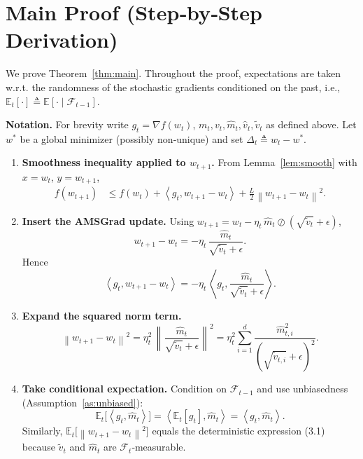 \documentclass{article}
\newcommand{\E}{\mathbb{E}}
\newcommand{\norm}[1]{\left\lVert #1 \right\rVert}
\newcommand{\inner}[2]{\left\langle #1,#2 \right\rangle}
\begin{document}
\section*{Main Proof (Step‑by‑Step Derivation)}
We prove Theorem~\ref{thm:main}. Throughout the proof, expectations are taken w.r.t. the randomness of the stochastic gradients conditioned on the past, i.e., $\E_{t}[\cdot]\triangleq \E[\cdot\mid\mathcal{F}_{t-1}]$.

\noindent\textbf{Notation.} For brevity write $g_{t}=\nabla f(w_{t})$, $m_{t},v_{t},\hat m_{t},\hat v_{t},\tilde v_{t}$ as defined above. Let $w^{*}$ be a global minimizer (possibly non‑unique) and set $\Delta_{t}\triangleq w_{t}-w^{*}$.

\begin{enumerate}
\item[Step 1.] \textbf{Smoothness inequality applied to $w_{t+1}$.}  
From Lemma~\ref{lem:smooth} with $x=w_{t}$, $y=w_{t+1}$,
\begin{align}
f(w_{t+1}) &\le f(w_{t}) + \inner{g_{t}}{w_{t+1}-w_{t}} + \frac{L}{2}\norm{w_{t+1}-w_{t}}^{2}. \label{eq:smooth}
\end{align}
\item[Step 2.] \textbf{Insert the AMSGrad update.}  
Using $w_{t+1}=w_{t}-\eta_{t}\,\hat m_{t}\oslash(\sqrt{\tilde v_{t}}+\epsilon)$,
\[
w_{t+1}-w_{t}= -\eta_{t}\,\frac{\hat m_{t}}{\sqrt{\tilde v_{t}}+\epsilon}.
\]
Hence
\[
\inner{g_{t}}{w_{t+1}-w_{t}} = -\eta_{t}\,\inner{g_{t}}{\frac{\hat m_{t}}{\sqrt{\tilde v_{t}}+\epsilon}}.
\tag{2.1}
\]
\item[Step 3.] \textbf{Expand the squared norm term.}
\[
\norm{w_{t+1}-w_{t}}^{2}= \eta_{t}^{2}\,
\norm{\frac{\hat m_{t}}{\sqrt{\tilde v_{t}}+\epsilon}}^{2}
= \eta_{t}^{2}\sum_{i=1}^{d}\frac{\hat m_{t,i}^{2}}{(\sqrt{\tilde v_{t,i}}+\epsilon)^{2}}.
\tag{3.1}
\]
\item[Step 4.] \textbf{Take conditional expectation.}  
Condition on $\mathcal{F}_{t-1}$ and use unbiasedness (Assumption~\ref{as:unbiased}):
\[
\E_{t}\bigl[\inner{g_{t}}{\hat m_{t}}\bigr]
= \inner{\E_{t}[g_{t}]}{\hat m_{t}}
= \inner{g_{t}}{\hat m_{t}}.
\]
Similarly, $\E_{t}\bigl[\norm{w_{t+1}-w_{t}}^{2}\bigr]$ equals the deterministic expression (3.1) because $\tilde v_{t}$ and $\hat m_{t}$ are $\mathcal{F}_{t}$‑measurable.


\end{enumerate}
\end{document}
